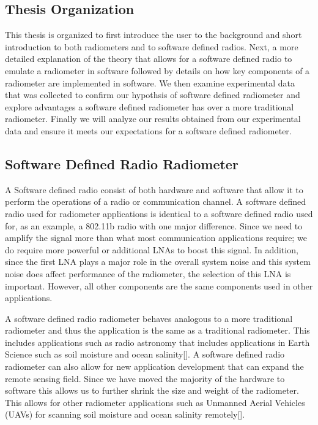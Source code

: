 \subsection{Thesis Organization}
This thesis is organized to first introduce the user to the background and short introduction to both radiometers and to software defined radios.  Next, a more detailed explanation of the theory that allows for a software defined radio to emulate a radiometer in software followed by details on how key components of a radiometer are implemented in software.  We then examine experimental data that was collected to confirm our hypothsis of software defined radiometer and explore advantages a software defined radiometer has over a more traditional radiometer.  Finally we will analyze our results obtained from our experimental data and ensure it meets our expectations for a software defined radiometer.

\subsection{Software Defined Radio Radiometer}

A Software defined radio consist of both hardware and software that allow it to perform the operations of a radio or communication channel.  A software defined radio used for radiometer applications is identical to a software defined radio used for, as an example, a 802.11b radio with one major difference.  Since we need to amplify the signal more than what most communication applications require; we do require more powerful or additional LNAs to boost this signal.  In addition, since the first LNA plays a major role in the overall system noise and this system noise does affect performance of the radiometer, the selection of this LNA is important.  However, all other components are the same components used in other applications.

A software defined radio radiometer behaves analogous to a more traditional radiometer and thus the application is the same as a traditional radiometer.  This includes applications such as radio astronomy that includes applications in Earth Science such as soil moisture and ocean salinity[\cite{Ruf}].  A software defined radio radiometer can also allow for new application development that can expand the remote sensing field.  Since we have moved the majority of the hardware to software this allows us to further shrink the size and weight of the radiometer.  This allows for other radiometer applications such as Unmanned Aerial Vehicles (UAVs) for scanning soil moisture and ocean salinity remotely[\cite{McIntyre}].  

